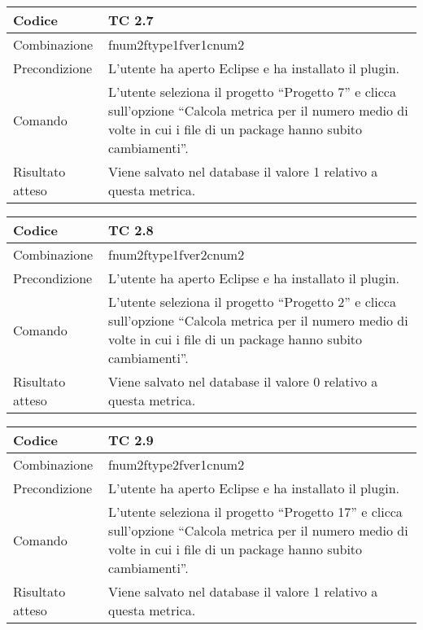 \begin{table}[ht]
\begin{tabular}{|p{3cm}|p{9cm}|}
\hline
\cellcolor{lightgray}Codice				& TC 2.7								\\
\hline
\cellcolor{lightgray}Combinazione		& fnum2ftype1fver1cnum2									\\
\hline
\cellcolor{lightgray}Precondizione		& L'utente ha aperto Eclipse e ha installato il plugin.		\\
\hline
\cellcolor{lightgray}Comando			& L'utente seleziona il progetto ``Progetto 7''  e clicca sull'opzione ``Calcola metrica per il numero medio di volte in cui i file di un package hanno subito cambiamenti''.	\\
\hline
\cellcolor{lightgray}Risultato atteso	& Viene salvato nel database il valore 1 relativo a questa metrica.\\
\hline
\end{tabular}
\end{table}

\begin{table}[ht]
\begin{tabular}{|p{3cm}|p{9cm}|}
\hline
\cellcolor{lightgray}Codice				& TC 2.8								\\
\hline
\cellcolor{lightgray}Combinazione		& fnum2ftype1fver2cnum2										\\
\hline
\cellcolor{lightgray}Precondizione		& L'utente ha aperto Eclipse e ha installato il plugin.		\\
\hline
\cellcolor{lightgray}Comando			& L'utente seleziona il progetto ``Progetto 2''  e clicca sull'opzione ``Calcola metrica per il numero medio di volte in cui i file di un package hanno subito cambiamenti''.	\\
\hline
\cellcolor{lightgray}Risultato atteso	& Viene salvato nel database il valore 0 relativo a questa metrica.\\
\hline
\end{tabular}
\end{table}

\begin{table}[ht]
\begin{tabular}{|p{3cm}|p{9cm}|}
\hline
\cellcolor{lightgray}Codice				& TC 2.9								\\
\hline
\cellcolor{lightgray}Combinazione		& fnum2ftype2fver1cnum2									\\
\hline
\cellcolor{lightgray}Precondizione		& L'utente ha aperto Eclipse e ha installato il plugin.		\\
\hline
\cellcolor{lightgray}Comando			& L'utente seleziona il progetto ``Progetto 17''  e clicca sull'opzione ``Calcola metrica per il numero medio di volte in cui i file di un package hanno subito cambiamenti''.	\\
\hline
\cellcolor{lightgray}Risultato atteso	& Viene salvato nel database il valore 1 relativo a questa metrica.\\
\hline
\end{tabular}
\end{table}

